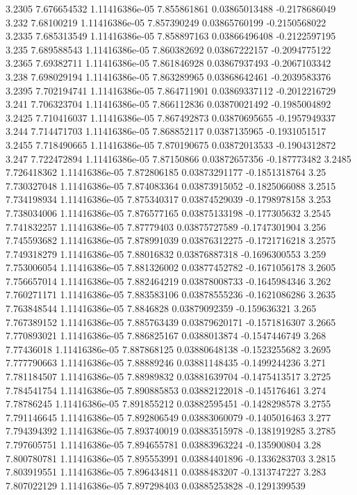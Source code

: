 {3.2305 7.676654532 1.11416386e-05 7.855861861 0.03865013488 -0.2178686049
3.232 7.68100219 1.11416386e-05 7.857390249 0.03865760199 -0.2150568022
3.2335 7.685313549 1.11416386e-05 7.858897163 0.03866496408 -0.2122597195
3.235 7.689588543 1.11416386e-05 7.860382692 0.03867222157 -0.2094775122
3.2365 7.69382711 1.11416386e-05 7.861846928 0.03867937493 -0.2067103342
3.238 7.698029194 1.11416386e-05 7.863289965 0.03868642461 -0.2039583376
3.2395 7.702194741 1.11416386e-05 7.864711901 0.03869337112 -0.2012216729
3.241 7.706323704 1.11416386e-05 7.866112836 0.03870021492 -0.1985004892
3.2425 7.710416037 1.11416386e-05 7.867492873 0.03870695655 -0.1957949337
3.244 7.714471703 1.11416386e-05 7.868852117 0.0387135965 -0.1931051517
3.2455 7.718490665 1.11416386e-05 7.870190675 0.03872013533 -0.1904312872
3.247 7.722472894 1.11416386e-05 7.87150866 0.03872657356 -0.187773482
3.2485 7.726418362 1.11416386e-05 7.872806185 0.03873291177 -0.1851318764
3.25 7.730327048 1.11416386e-05 7.874083364 0.03873915052 -0.1825066088
3.2515 7.734198934 1.11416386e-05 7.875340317 0.03874529039 -0.1798978158
3.253 7.738034006 1.11416386e-05 7.876577165 0.03875133198 -0.177305632
3.2545 7.741832257 1.11416386e-05 7.87779403 0.03875727589 -0.1747301904
3.256 7.745593682 1.11416386e-05 7.878991039 0.03876312275 -0.1721716218
3.2575 7.749318279 1.11416386e-05 7.88016832 0.03876887318 -0.1696300553
3.259 7.753006054 1.11416386e-05 7.881326002 0.03877452782 -0.1671056178
3.2605 7.756657014 1.11416386e-05 7.882464219 0.03878008733 -0.1645984346
3.262 7.760271171 1.11416386e-05 7.883583106 0.03878555236 -0.1621086286
3.2635 7.763848544 1.11416386e-05 7.8846828 0.03879092359 -0.159636321
3.265 7.767389152 1.11416386e-05 7.885763439 0.03879620171 -0.1571816307
3.2665 7.770893021 1.11416386e-05 7.886825167 0.0388013874 -0.1547446749
3.268 7.77436018 1.11416386e-05 7.887868125 0.03880648138 -0.1523255682
3.2695 7.777790663 1.11416386e-05 7.88889246 0.03881148435 -0.1499244236
3.271 7.781184507 1.11416386e-05 7.88989832 0.03881639704 -0.1475413517
3.2725 7.784541754 1.11416386e-05 7.890885853 0.03882122018 -0.145176461
3.274 7.78786245 1.11416386e-05 7.891855212 0.03882595451 -0.1428298578
3.2755 7.791146645 1.11416386e-05 7.892806549 0.03883060079 -0.1405016463
3.277 7.794394392 1.11416386e-05 7.893740019 0.03883515978 -0.1381919285
3.2785 7.797605751 1.11416386e-05 7.894655781 0.03883963224 -0.135900804
3.28 7.800780781 1.11416386e-05 7.895553991 0.03884401896 -0.1336283703
3.2815 7.803919551 1.11416386e-05 7.896434811 0.0388483207 -0.1313747227
3.283 7.807022129 1.11416386e-05 7.897298403 0.03885253828 -0.1291399539
}
